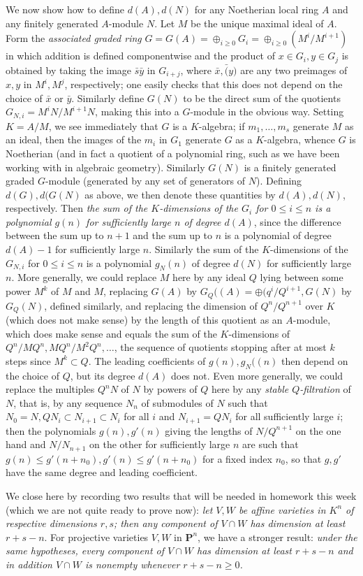 \documentclass[10pt]{article}
\begin{document}
We now show how to define $d(A), d(N)$ for any Noetherian local ring $A$
and any finitely generated $A$-module $N$. Let $M$ be the unique maximal
ideal of $A$. Form the {\sl associated graded ring} $G=G(A) =
\oplus_{i\ge0} G_i = \oplus_{i\ge0} (M^i/M^{i+1})$ in which addition is
defined componentwise and the product of $x\in G_i,y\in G_j$ is obtained
by taking the image $\bar{s}\bar{y}$ in $G_{i+j}$, where
$\bar{x},\bar(y)$ are any two preimages of $x,y$ in $M^i,M^j$,
respectively; one easily checks that this does not depend on the choice
of $\bar{x}$ or $\bar{y}$. Similarly define $G(N)$ to be the direct sum
of the quotients $G_{N,i} = M^i N/M^{i+1} N$, making this into a
$G$-module in the obvious way. Setting $K=A/M$, we see immediately that
$G$ is a $K$-algebra; if $m_1,\ldots,m_s$ generate $M$ as an ideal, then
the images of the $m_i$ in $G_1$ generate $G$ as a $K$-algebra, whence
$G$ is Noetherian (and in fact a quotient of a polynomial ring, such as
we have been working with in algebraic geometry). Similarly $G(N)$ is a
finitely generated graded $G$-module (generated by any set of generators
of $N$). Defining $d(G),d(G(N)$ as above, we then denote these
quantities by $d(A),d(N)$, respectively. Then {\sl the sum of the
  $K$-dimensions of the $G_i$ for $0\le i\le n$ is a polynomial $g(n)$
  for sufficiently large $n$ of degree $d(A)$}, since the difference
between the sum up to $n+1$ and the sum up to $n$ is a polynomial of
degree $d(A) - 1$ for sufficiently large $n$. Similarly the sum of the
$K$-dimensions of the $G_{N,i}$ for $0\le i\le n$ is a polynomial
$g_N(n)$ of degree $d(N)$ for sufficiently large $n$. More generally, we
could replace $M$ here by any ideal $Q$ lying between some power $M^k$
of $M$ and $M$, replacing $G(A)$ by $G_Q((A) = \oplus (q^i/Q^{i+1},
G(N)$ by $G_Q(N)$, defined similarly, and replacing the dimension of
$Q^n/Q^{n+1}$ over $K$ (which does not make sense) by the length of this
quotient as an $A$-module, which does make sense and equals the sum of
the $K$-dimensions of $Q^n/MQ^n, MQ^n/M^2Q^n,\ldots$, the sequence of
quotients stopping after at most $k$ steps since $M^k\subset Q$. The
leading coefficients of $g(n),g_N((n)$ then depend on the choice of $Q$,
but its degree $d(A)$ does not. Even more generally, we could replace
the multiples $Q^nN$ of $N$ by powers of $Q$ here by any {\sl stable
  $Q$-filtration} of $N$, that is, by any sequence $N_n$ of submodules
of $N$ such that $N_0 = N, QN_i\subset N_{i+1}\subset N_i$ for all $i$
and $N_{i+1}= QN_i$ for all sufficiently large $i$; then the polynomials
$g(n),g'(n)$ giving the lengths of $N/Q^{n+1}$ on the one hand and
$N/N_{n+1}$ on the other for sufficiently large $n$ are such that
$g(n)\le g'(n+n_0), g'(n)\le g'(n+n_0)$ for a fixed index $n_0$, so that
$g,g'$ have the same degree and leading coefficient.

We close here by recording two results that will be needed in homework
this week (which we are not quite ready to prove now): {\sl let $V,W$ be
  affine varieties in $K^n$ of respective dimensions $r,s$; then any
  component of $V\cap W$ has dimension at least $r+s-n$}. For projective
varieties $V,W$ in $\mathbf P^n$, we have a stronger result: {\sl under the
  same hypotheses, every component of $V\cap W$ has dimension at least
  $r+s-n$ and in addition $V\cap W$ is nonempty whenever $r+s-n\ge0$.}
\end{document}
